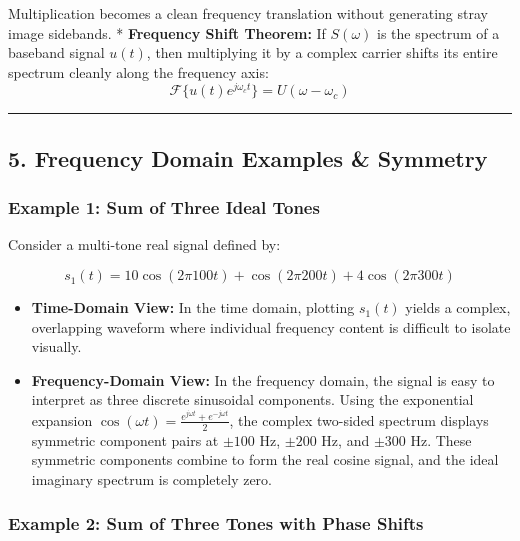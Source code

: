 \documentclass[
]{article}
\providecommand{\tightlist}{%
  \setlength{\itemsep}{0pt}\setlength{\parskip}{0pt}}
\begin{document}
Multiplication becomes a clean frequency translation without generating
stray image sidebands. * \textbf{Frequency Shift Theorem:} If
\(S(\omega)\) is the spectrum of a baseband signal \(u(t)\), then
multiplying it by a complex carrier shifts its entire spectrum cleanly
along the frequency axis:$$\mathcal{F}\{ u(t) e^{j\omega_c t} \} = U(\omega - \omega_c)$$

\begin{center}\rule{0.5\linewidth}{0.5pt}\end{center}

\subsection{5. Frequency Domain Examples \&
Symmetry}\label{frequency-domain-examples-symmetry}

\subsubsection{Example 1: Sum of Three Ideal
Tones}\label{example-1-sum-of-three-ideal-tones}

Consider a multi-tone real signal defined by:

\[s_1(t) = 10\cos(2\pi 100 t) + \cos(2\pi 200 t) + 4\cos(2\pi 300 t)\]

\begin{itemize}
\tightlist
\item
  \textbf{Time-Domain View:} In the time domain, plotting \(s_1(t)\)
  yields a complex, overlapping waveform where individual frequency
  content is difficult to isolate visually.
\item
  \textbf{Frequency-Domain View:} In the frequency domain, the signal is
  easy to interpret as three discrete sinusoidal components. Using the
  exponential expansion
  \(\cos(\omega t) = \frac{e^{j\omega t} + e^{-j\omega t}}{2}\), the
  complex two-sided spectrum displays symmetric component pairs at
  \(\pm 100\text{ Hz}\), \(\pm 200\text{ Hz}\), and
  \(\pm 300\text{ Hz}\). These symmetric components combine to form the
  real cosine signal, and the ideal imaginary spectrum is completely
  zero.
\end{itemize}

\subsubsection{Example 2: Sum of Three Tones with Phase
Shifts}\label{example-2-sum-of-three-tones-with-phase-shifts}
\end{document}
